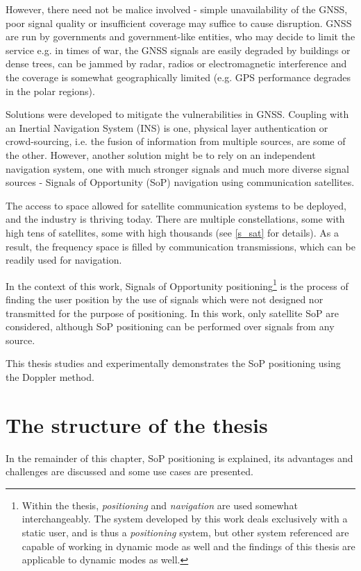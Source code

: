 However, there need not be malice involved - simple unavailability of the GNSS, poor signal quality or insufficient coverage may suffice to cause disruption. GNSS are run by governments and government-like entities, who may decide to limit the service e.g. in times of war, the GNSS signals are easily degraded by buildings or dense trees, can be jammed by radar, radios or electromagnetic interference and the coverage is somewhat geographically limited (e.g. GPS performance degrades in the polar regions\cite{int01, int02}).

Solutions were developed to mitigate the vulnerabilities in GNSS. Coupling with an Inertial Navigation System (INS) is one, physical layer authentication\cite{sat08} or crowd-sourcing, i.e. the fusion of information from multiple sources, are some of the other\cite{int01}. However, another solution might be to rely on an independent navigation system, one with much stronger signals and much more diverse signal sources - Signals of Opportunity (SoP) navigation using communication satellites.

The access to space allowed for satellite communication systems to be deployed, and the industry is thriving today. There are multiple constellations, some with high tens of satellites, some with high thousands (see \autoref{s_sat} for details). As a result, the frequency space is filled by communication transmissions, which can be readily used for navigation.

In the context of this work, Signals of Opportunity positioning\footnote{Within the thesis, \textit{positioning} and \textit{navigation} are used somewhat interchangeably. The system developed by this work deals exclusively with a static user, and is thus a \textit{positioning} system, but other system referenced are capable of working in dynamic mode as well and the findings of this thesis are applicable to dynamic modes as well.} is the process of finding the user position by the use of signals which were not designed nor transmitted for the purpose of positioning. In this work, only satellite SoP are considered, although SoP positioning can be performed over signals from any source. 

This thesis studies and experimentally demonstrates the SoP positioning using the Doppler method.



\section{The structure of the thesis}
In the remainder of this chapter, SoP positioning is explained, its advantages and challenges are discussed and some use cases are presented.

